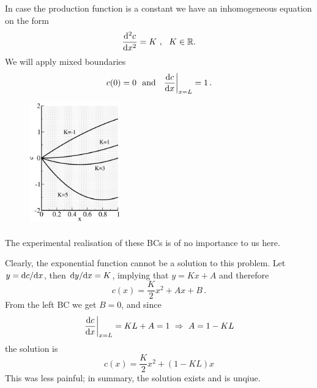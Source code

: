\begin{example}
	In case the production function is a constant we have an inhomogeneous
	equation on the form
	\begin{equation}
		\frac{\mathrm{d}^2c}{\mathrm{d} x^2} = K \ , \ \ K\in \mathbb{R}.
	\end{equation}
	We will apply mixed boundaries
	\begin{equation}
		c(0)=0 \ \ \text{and} \ \ \left.\frac{\mathrm{d} c}{\mathrm{d} x}\right|_{x=L}=1 \, .
	\end{equation}

	\begin{figure}
		\centering
		\includegraphics[width=0.35\textwidth]{figs/solutionEx4.eps}
		\caption*{}
	\end{figure}
	\paragraph{}
	\vspace*{-\parskip}
	The experimental realisation of these BCs is of no importance to us here. 

	Clearly, the exponential function cannot be a solution to this problem. 
	Let $y=\mathrm{d} c/\mathrm{d} x$, then	$\mathrm{d} y/\mathrm{d} x = K$, implying that $y = Kx + A$ and therefore
	\begin{equation}
		c(x) = \frac{K}{2}x^2 + Ax + B \, .
	\end{equation}
	From the left BC we get $B=0$, and since 
	\begin{equation}
	 \left.\frac{\mathrm{d} c}{\mathrm{d} x}\right|_{x=L}= KL + A = 1 \ \Rightarrow \ A = 1 - KL
	\end{equation}
	the solution is 
	\begin{equation}
	\label{eq:solutionEx4}
	 c(x) = \frac{K}{2}x^2 + (1-KL)x 
	\end{equation}
	This was less painful; 
	in summary, the solution exists and is unqiue.   
\end{example}

